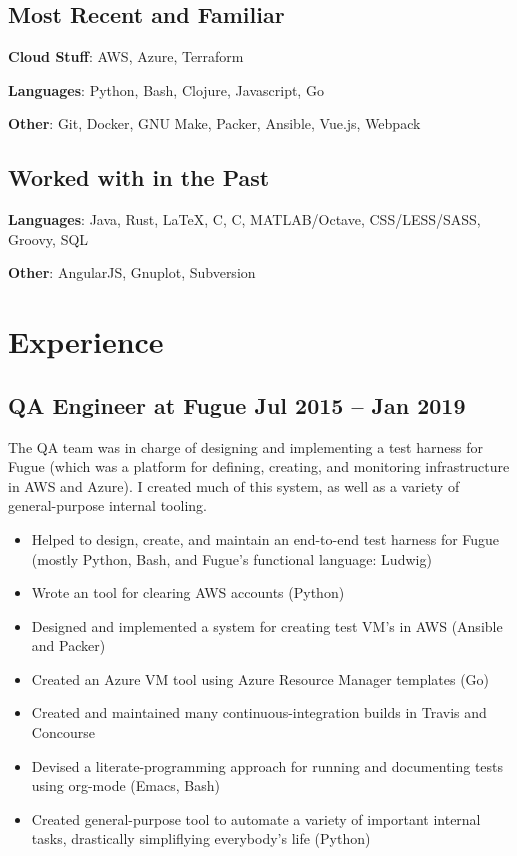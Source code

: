 \documentclass[12pt]{article}
\def\CC{{C\nolinebreak[4]\hspace{-.05em}\raisebox{.4ex}{\tiny\bf ++}}}
\begin{document}
\begin{multicols}{2}
  \raggedright

  \subsection*{Most Recent and Familiar}

  \textbf{Cloud Stuff}: AWS, Azure, Terraform

  \textbf{Languages}: Python, Bash, Clojure, Javascript, Go

  \textbf{Other}: Git, Docker, GNU Make, Packer, Ansible, Vue.js, Webpack

  \subsection*{Worked with in the Past}

  \textbf{Languages}: Java, Rust, \LaTeX, C, \CC, MATLAB/Octave, CSS/LESS/SASS,
  Groovy, SQL

  \textbf{Other}: AngularJS, Gnuplot, Subversion

  \vfill
  \columnbreak

\end{multicols}


\section*{Experience}

\subsection*{QA Engineer at Fugue \hfill Jul 2015 -- Jan 2019}

The QA team was in charge of designing and implementing a test harness for Fugue
(which was a platform for defining, creating, and monitoring infrastructure in
AWS and Azure). I created much of this system, as well as a variety of
general-purpose internal tooling.

\begin{itemize}
\item Helped to design, create, and maintain an end-to-end test harness for
  Fugue (mostly Python, Bash, and Fugue's functional language: Ludwig)
\item Wrote an tool for clearing AWS accounts (Python)
\item Designed and implemented a system for creating test VM's in AWS (Ansible
  and Packer)
\item Created an Azure VM tool using Azure Resource Manager templates (Go)
\item Created and maintained many continuous-integration builds in Travis and
  Concourse
\item Devised a literate-programming approach for running and documenting tests
  using org-mode (Emacs, Bash)
\item Created general-purpose tool to automate a variety of important internal
  tasks, drastically simpliflying everybody's life (Python)
\end{itemize}
\end{document}
